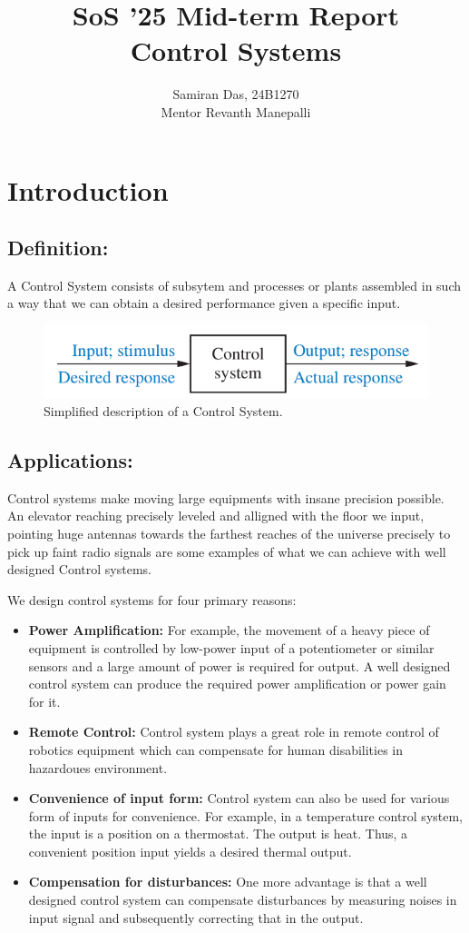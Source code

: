 \documentclass{report}
\author{Samiran Das, 24B1270\\
Mentor \- Revanth Manepalli}
\title{SoS '25 Mid-term Report\\
Control Systems}
\begin{document}
\maketitle

\chapter{Introduction}

\section{Definition:}
A Control System consists of subsytem and processes or plants assembled 
in such a way that we can obtain a desired performance given a specific input.

\begin{figure}[htbp]
    \centering
    \includegraphics[scale=0.5]{images/cs_simple_bd.png}
    \caption{Simplified description of a Control System.}
\end{figure}

\section{Applications:}
Control systems make moving large equipments with insane precision possible.
An elevator reaching precisely leveled and alligned with the floor we input,
pointing huge antennas towards the farthest reaches of the universe precisely
to pick up faint radio signals are some examples of what we can achieve with well designed Control systems.
\par
We design control systems for four primary reasons:
\begin{itemize}
    \item \textbf{Power Amplification:} For example, the movement of a heavy piece of equipment is
    controlled by low-power input of a potentiometer or similar sensors and a large amount of power
    is required for output. A well designed control system can produce the required power amplification
    or power gain for it.
    \item \textbf{Remote Control:} Control system plays a great role in remote control of robotics equipment
    which can compensate for human disabilities in hazardoues environment.
    \item \textbf{Convenience of input form:} Control system can also be used for various form of inputs for convenience.
    For example, in a temperature control system, the input is a position on a thermostat. The output is heat. Thus, a convenient
    position input yields a desired thermal output.
    \item \textbf{Compensation for disturbances:} One more advantage is that a well designed control system can compensate disturbances
    by measuring noises in input signal and subsequently correcting that in the output.
\end{itemize}
\end{document}
